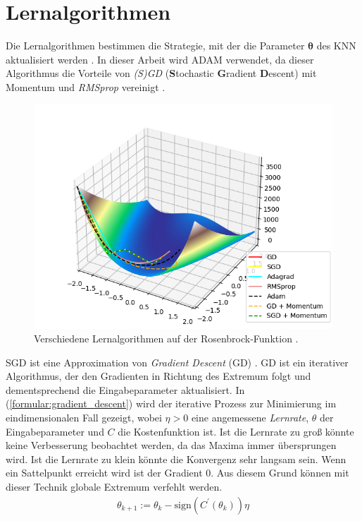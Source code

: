 \section{Lernalgorithmen}
Die Lernalgorithmen bestimmen die Strategie, mit der die Parameter $\boldsymbol\theta$ des KNN aktualisiert werden \cite{higham2019deep}.
In dieser Arbeit wird ADAM verwendet, da dieser Algorithmus die Vorteile von \textit{(S)GD} (\textbf{S}tochastic \textbf{G}radient \textbf{D}escent)
mit Momentum und \textit{RMSprop} vereinigt \cite{kingma2014adam, higham2019deep}.
\begin{figure}[h!]
    \centering
    \includegraphics[width=0.8\linewidth]{images/learn_algorithms.png}
    \caption{Verschiedene Lernalgorithmen auf der Rosenbrock-Funktion \cite{rosenbrock}.}
    \label{fig:learn_algorithms}
\end{figure}
\newpage
SGD ist eine Approximation von \textit{Gradient Descent} (GD) \cite{bengio2017deep}.
GD ist ein iterativer Algorithmus, der den Gradienten in Richtung des Extremum folgt und dementsprechend die Eingabeparameter aktualisiert.
\newline
\newline
In (\ref{formular:gradient_descent}) wird der iterative Prozess zur Minimierung im eindimensionalen Fall gezeigt,
wobei $\eta > 0$ eine angemessene \textit{Lernrate}, $\theta$ der Eingabeparameter und $C$ die Kostenfunktion ist.
Ist die Lernrate zu groß könnte keine Verbesserung beobachtet werden, da das Maxima immer übersprungen wird.
Ist die Lernrate zu klein könnte die Konvergenz sehr langsam sein.
Wenn ein Sattelpunkt erreicht wird ist der Gradient 0.
Aus diesem Grund können mit dieser Technik globale Extremum verfehlt werden.
\begin{align}
    \label{formular:gradient_descent}
    \theta_{k+1} := \theta_k - \text{sign}(C^{\prime}(\theta_k))\eta
\end{align}
